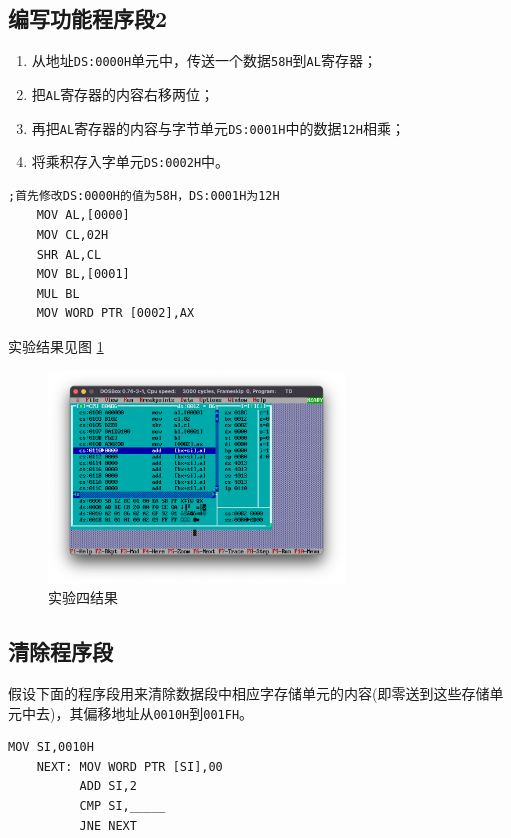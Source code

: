 \documentclass[11pt]{SEU-Digital-Report}
\begin{document}
\subsection{编写功能程序段2}
\begin{enumerate}
    \item 从地址\texttt{DS:0000H}单元中，传送一个数据\texttt{58H}到\texttt{AL}寄存器；
    \item 把\texttt{AL}寄存器的内容右移两位；
    \item 再把\texttt{AL}寄存器的内容与字节单元\texttt{DS:0001H}中的数据\texttt{12H}相乘；
    \item 将乘积存入字单元\texttt{DS:0002H}中。
\end{enumerate}

\begin{lstlisting}[language={[x86masm]Assembler},title=code]
    ;首先修改DS:0000H的值为58H，DS:0001H为12H
    MOV AL,[0000]
    MOV CL,02H
    SHR AL,CL
    MOV BL,[0001]
    MUL BL
    MOV WORD PTR [0002],AX
\end{lstlisting}

实验结果见图 \ref{fig:rlt4}
\begin{figure}[htbp]
    \centering
    \includegraphics[width=0.7\textwidth]{fig/rlt4.png}
    \caption{实验四结果}
    \label{fig:rlt4} 
\end{figure}

\subsection{清除程序段}
假设下面的程序段用来清除数据段中相应字存储单元的内容(即零送到这些存储单元中去)，其偏移地址从\texttt{0010H}到\texttt{001FH}。
\begin{lstlisting}[language={[x86masm]Assembler},title=code]
          MOV SI,0010H
    NEXT: MOV WORD PTR [SI],00
          ADD SI,2
          CMP SI,_____   
          JNE NEXT
\end{lstlisting}
\end{document}
